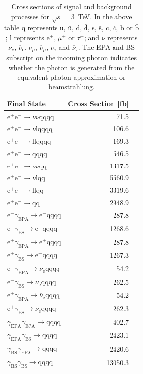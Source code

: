 \begin{table}[h!]
\centering
\begin{tabular}{ l r r }
\hline
Final State & Cross Section [fb]  \\ 
\hline
$\text{e}^{+}\text{e}^{-} \rightarrow \nu{\nu}\text{qqqq}$ & 71.5 \\
$\text{e}^{+}\text{e}^{-} \rightarrow \nu\text{lqqqq}$ & 106.6 \\
$\text{e}^{+}\text{e}^{-} \rightarrow \text{llqqqq}$ & 169.3 \\
$\text{e}^{+}\text{e}^{-} \rightarrow \text{qqqq}$ & 546.5 \\
$\text{e}^{+}\text{e}^{-} \rightarrow \nu{\nu}\text{qq}$ & 1317.5 \\
$\text{e}^{+}\text{e}^{-} \rightarrow \nu\text{lqq}$ & 5560.9 \\
$\text{e}^{+}\text{e}^{-} \rightarrow \text{llqq}$ & 3319.6 \\
$\text{e}^{+}\text{e}^{-} \rightarrow \text{qq}$ & 2948.9 \\
$\text{e}^{-}\gamma_{\text{EPA}} \rightarrow \text{e}^{-}\text{qqqq}$ & 287.8 \\
$\text{e}^{-}\gamma_{\text{BS}} \rightarrow \text{e}^{-}\text{qqqq}$ & 1268.6 \\
$\text{e}^{+}\gamma_{\text{EPA}} \rightarrow \text{e}^{+}\text{qqqq}$ & 287.8 \\
$\text{e}^{+}\gamma_{\text{BS}} \rightarrow \text{e}^{+}\text{qqqq}$ & 1267.3 \\
$\text{e}^{-}\gamma_{\text{EPA}} \rightarrow \nu_{\text{e}}\text{qqqq}$ & 54.2 \\
$\text{e}^{-}\gamma_{\text{BS}} \rightarrow \nu_{\text{e}}\text{qqqq}$ & 262.5 \\
$\text{e}^{+}\gamma_{\text{EPA}} \rightarrow \overline{\nu}_{\text{e}}\text{qqqq}$ & 54.2 \\
$\text{e}^{+}\gamma_{\text{BS}} \rightarrow \overline{\nu}_{\text{e}}\text{qqqq}$ & 262.3 \\
$\gamma_{\text{EPA}}\gamma_{\text{EPA}} \rightarrow \text{qqqq}$ & 402.7 \\
$\gamma_{\text{EPA}}\gamma_{\text{BS}} \rightarrow \text{qqqq}$ & 2423.1 \\
$\gamma_{\text{BS}}\gamma_{\text{EPA}} \rightarrow \text{qqqq}$ & 2420.6 \\
$\gamma_{\text{BS}}\gamma_{\text{BS}} \rightarrow \text{qqqq}$ & 13050.3 \\
\hline
\end{tabular}
\caption[Cross sections of signal and background processes for $\sqrt{s}=3$~TeV]{Cross sections of signal and background processes for $\sqrt{s}=3$~TeV.  In the above table q represents u, $\bar{\text{u}}$, d, $\bar{\text{d}}$, s, $\bar{\text{s}}$, c, $\bar{\text{c}}$, b or $\bar{\text{b}}$;  l represents $\text{e}^{\pm}$, $\mu^{\pm}$ or $\tau^{\pm}$; and $\nu$ represents $\nu_{e}$, $\overline{\nu}_{\text{e}}$, $\nu_{\mu}$, $\overline{\nu}_{\mu}$, $\nu_{\tau}$ and $\overline{\nu}_{\tau}$.  The EPA and BS subscript on the incoming photon indicates whether the photon is generated from the equivalent photon approximation or beamstrahlung.}
\label{table:crosssection3000GeV}
\end{table}

